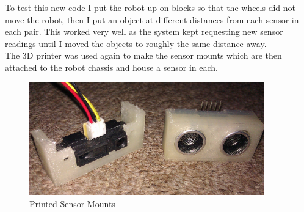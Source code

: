 To test this new code I put the robot up on blocks so that the wheels did not move the robot, then I put an object at different distances from each sensor in each pair.  This worked very well as the system kept requesting new sensor readings until I moved the objects to roughly the same distance away.
\\The 3D printer was used again to make the sensor mounts which are then attached to the robot chassis and house a sensor in each.
\begin{figure}[H]
\centering
        \includegraphics[width=4.0in]  {Images/printed-sensor-mounts.jpg}
        \caption{Printed Sensor Mounts}
        \label{Printed Sensor Mounts}
\end{figure}
